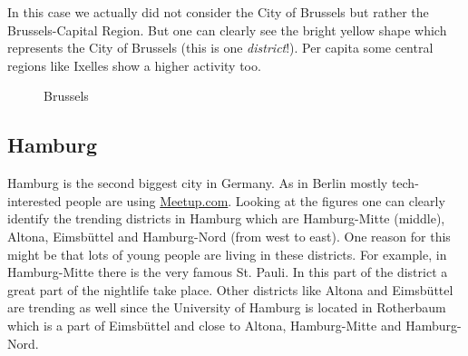 In this case we actually did not consider the City of Brussels but rather the Brussels-Capital Region. But one can clearly see the bright yellow shape which represents the City of Brussels (this is one \emph{district}!). Per capita some central regions like Ixelles show a higher activity too. 
\begin{figure}[!b]
	\hfill
	\caption{Brussels}\label{fig:madridmap}
\end{figure}

\subsection*{Hamburg}
Hamburg is the second biggest city in Germany. As in Berlin mostly tech-interested people are using \url{Meetup.com}. Looking at the figures one can clearly identify the trending districts in Hamburg which are Hamburg-Mitte (middle), Altona, Eimsbüttel and Hamburg-Nord (from west to east). One reason for this might be that lots of young people are living in these districts. For example, in Hamburg-Mitte there is the very famous St. Pauli. In this part of the district a great part of the nightlife take place. Other districts like Altona and Eimsbüttel are trending as well since the University of Hamburg is located in Rotherbaum which is a part of Eimsbüttel and close to Altona, Hamburg-Mitte and Hamburg-Nord.

